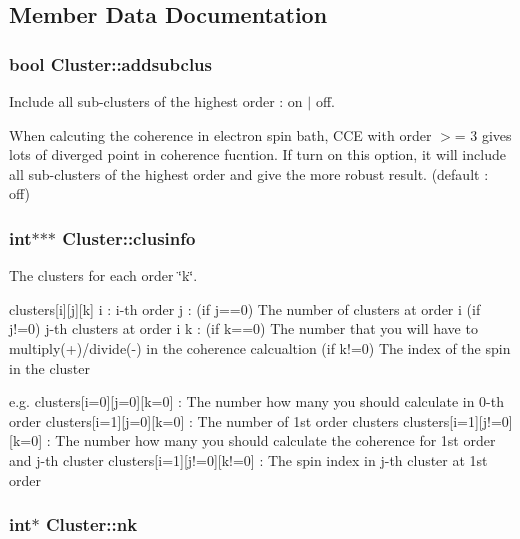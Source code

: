 \subsection{Member Data Documentation}
\hypertarget{structCluster_a33621fac416bdd2eea40805e74730748}{
\subsubsection[{addsubclus}]{\setlength{\rightskip}{0pt plus 5cm}bool Cluster\-::addsubclus}}\label{structCluster_a33621fac416bdd2eea40805e74730748}


Include all sub-\/clusters of the highest order \-: on $|$ off. 

When calcuting the coherence in electron spin bath, C\-C\-E with order $>$= 3 gives lots of diverged point in coherence fucntion. If turn on this option, it will include all sub-\/clusters of the highest order and give the more robust result. (default \-: off) \hypertarget{structCluster_afd65bde6cf52f123d1d1ab7a3fd9805c}{
\subsubsection[{clusinfo}]{\setlength{\rightskip}{0pt plus 5cm}int$\ast$$\ast$$\ast$ Cluster\-::clusinfo}}\label{structCluster_afd65bde6cf52f123d1d1ab7a3fd9805c}


The clusters for each order \char`\"{}k\char`\"{}. 

clusters\mbox{[}i\mbox{]}\mbox{[}j\mbox{]}\mbox{[}k\mbox{]} i \-: i-\/th order j \-: (if j==0) The number of clusters at order i (if j!=0) j-\/th clusters at order i k \-: (if k==0) The number that you will have to multiply(+)/divide(-\/) in the coherence calcualtion (if k!=0) The index of the spin in the cluster

e.\-g. clusters\mbox{[}i=0\mbox{]}\mbox{[}j=0\mbox{]}\mbox{[}k=0\mbox{]} \-: The number how many you should calculate in 0-\/th order clusters\mbox{[}i=1\mbox{]}\mbox{[}j=0\mbox{]}\mbox{[}k=0\mbox{]} \-: The number of 1st order clusters clusters\mbox{[}i=1\mbox{]}\mbox{[}j!=0\mbox{]}\mbox{[}k=0\mbox{]} \-: The number how many you should calculate the coherence for 1st order and j-\/th cluster clusters\mbox{[}i=1\mbox{]}\mbox{[}j!=0\mbox{]}\mbox{[}k!=0\mbox{]} \-: The spin index in j-\/th cluster at 1st order \hypertarget{structCluster_a1385a76b03a7f2f862526ff2bf449755}{
\subsubsection[{nk}]{\setlength{\rightskip}{0pt plus 5cm}int$\ast$ Cluster\-::nk}}\label{structCluster_a1385a76b03a7f2f862526ff2bf449755}


